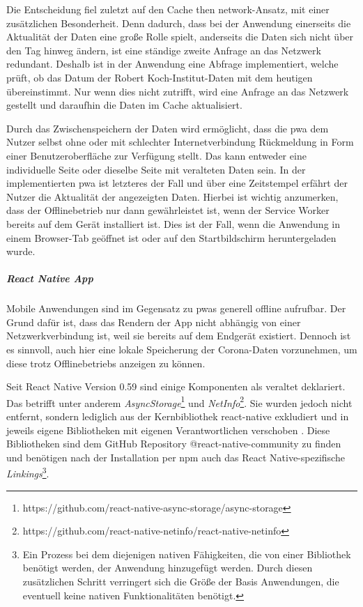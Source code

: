 Die Entscheidung fiel zuletzt auf den \glqq Cache then network\grqq{}-Ansatz, mit einer zusätzlichen Besonderheit.
Denn dadurch, dass bei der Anwendung einerseits die Aktualität der Daten eine große Rolle spielt, anderseits die Daten sich nicht über den Tag hinweg ändern, ist eine ständige zweite Anfrage an das Netzwerk redundant.
Deshalb ist in der Anwendung eine Abfrage implementiert, welche prüft, ob das Datum der Robert Koch-Institut-Daten mit dem heutigen übereinstimmt.
Nur wenn dies nicht zutrifft, wird eine Anfrage an das Netzwerk gestellt und daraufhin die Daten im Cache aktualisiert.

Durch das Zwischenspeichern der Daten wird ermöglicht, dass die \ac{pwa} dem Nutzer selbst ohne oder mit schlechter Internetverbindung Rückmeldung in Form einer Benutzeroberfläche zur Verfügung stellt.
Das kann entweder eine individuelle Seite oder dieselbe Seite mit veralteten Daten sein.
In der implementierten \ac{pwa} ist letzteres der Fall und über eine Zeitstempel erfährt der Nutzer die Aktualität der angezeigten Daten.
Hierbei ist wichtig anzumerken, dass der Offlinebetrieb nur dann gewährleistet ist, wenn der Service Worker bereits auf dem Gerät installiert ist.
Dies ist der Fall, wenn die Anwendung in einem Browser-Tab geöffnet ist oder auf den Startbildschirm heruntergeladen wurde.

\subparagraph{React Native App\\}
Mobile Anwendungen sind im Gegensatz zu \acp{pwa} generell offline aufrufbar.
Der Grund dafür ist, dass das Rendern der App nicht abhängig von einer Netzwerkverbindung ist, weil sie bereits auf dem Endgerät existiert.
Dennoch ist es sinnvoll, auch hier eine lokale Speicherung der Corona-Daten vorzunehmen, um diese trotz Offlinebetriebs anzeigen zu können.

Seit React Native Version 0.59 sind einige Komponenten als veraltet deklariert.
Das betrifft unter anderem \textit{AsyncStorage}\footnote{https://github.com/react-native-async-storage/async-storage} und \textit{NetInfo}\footnote{https://github.com/react-native-netinfo/react-native-netinfo}.
Sie wurden jedoch nicht entfernt, sondern lediglich aus der Kernbibliothek react-native exkludiert und in jeweils eigene Bibliotheken mit eigenen Verantwortlichen verschoben \cite{Turner.2019}.
Diese Bibliotheken sind dem GitHub Repository @react-native-community zu finden und benötigen nach der Installation per npm auch das React Native-spezifische \textit{Linkings}\footnote{Ein Prozess bei dem diejenigen nativen Fähigkeiten, die von einer Bibliothek benötigt werden, der Anwendung hinzugefügt werden. Durch diesen zusätzlichen Schritt verringert sich die Größe der Basis Anwendungen, die eventuell keine nativen Funktionalitäten benötigt.}.

